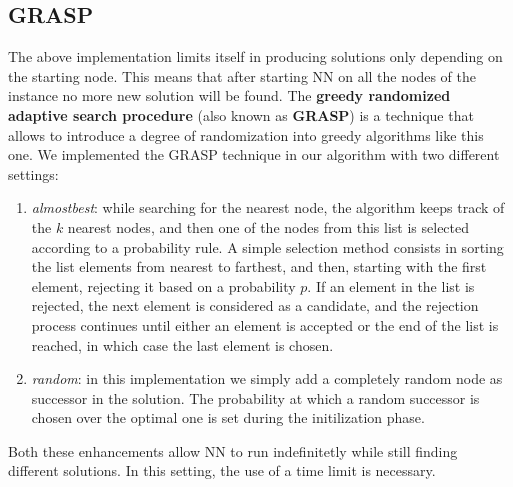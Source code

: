 \subsection{GRASP}
The above implementation limits itself in producing solutions only depending on the starting node.
This means that after starting NN on all the nodes of the instance no more new solution will be found.
The \textbf{greedy randomized adaptive search procedure} (also known as \textbf{GRASP}) is a technique that allows to introduce a degree of randomization into greedy algorithms like this one.
We implemented the GRASP technique in our algorithm with two different settings:
\begin{enumerate}
    \item \textit{almostbest}: 
    while searching for the nearest node, the algorithm keeps track of the $k$ nearest nodes, and then one of the nodes from this list is selected according to a probability rule.
    A simple selection method consists in sorting the list elements from nearest to farthest, and then, starting with the first element, rejecting it based on a probability $p$.
    If an element in the list is rejected, the next element is considered as a candidate, and the rejection process continues until either an element is accepted or the end of the list is reached, in which case the last element is chosen.
    \item \textit{random}:
    in this implementation we simply add a completely random node as successor in the solution.
    The probability at which a random successor is chosen over the optimal one is set during the initilization phase.
\end{enumerate}
Both these enhancements allow NN to run indefinitetly while still finding different solutions.
In this setting, the use of a time limit is necessary.


